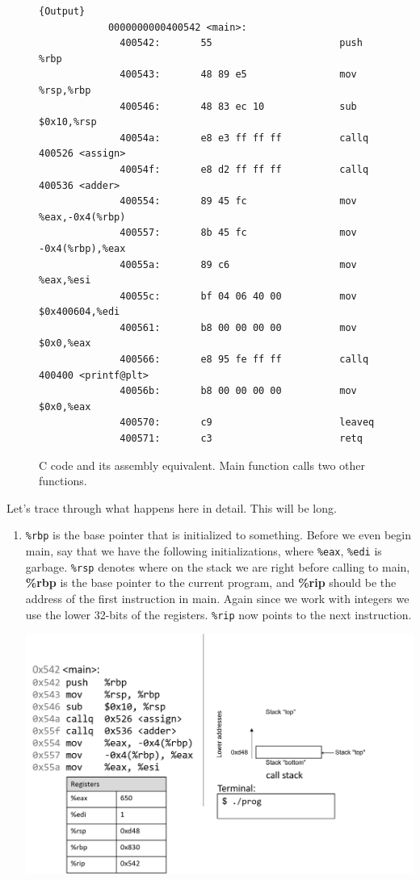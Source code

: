 \documentclass{article}
\begin{document}
\begin{example}
\begin{figure}[H]
\begin{minipage}{.74\textwidth}
\begin{lstlisting}[]{Output}
            0000000000400542 <main>:
              400542:       55                      push   %rbp
              400543:       48 89 e5                mov    %rsp,%rbp
              400546:       48 83 ec 10             sub    $0x10,%rsp
              40054a:       e8 e3 ff ff ff          callq  400526 <assign>
              40054f:       e8 d2 ff ff ff          callq  400536 <adder>
              400554:       89 45 fc                mov    %eax,-0x4(%rbp)
              400557:       8b 45 fc                mov    -0x4(%rbp),%eax
              40055a:       89 c6                   mov    %eax,%esi
              40055c:       bf 04 06 40 00          mov    $0x400604,%edi
              400561:       b8 00 00 00 00          mov    $0x0,%eax
              400566:       e8 95 fe ff ff          callq  400400 <printf@plt>
              40056b:       b8 00 00 00 00          mov    $0x0,%eax
              400570:       c9                      leaveq
              400571:       c3                      retq
          \end{lstlisting}
          \end{minipage}
          \caption{C code and its assembly equivalent. Main function calls two other functions. } 
          \label{fig:calling_functions}
        \end{figure}

        Let's trace through what happens here in detail. This will be long. 

        \begin{enumerate}
          \item \texttt{\%rbp} is the base pointer that is initialized to something. Before we even begin main, say that we have the following initializations, where \texttt{\%eax}, \texttt{\%edi} is garbage. \texttt{\%rsp} denotes where on the stack we are right before calling to main, \textbf{\%rbp} is the base pointer to the current program, and \textbf{\%rip} should be the address of the first instruction in main. Again since we work with integers we use the lower 32-bits of the registers. \texttt{\%rip} now points to the next instruction. 
            \begin{center}
              \includegraphics[scale=0.5]{img/Slide1.png}
            \end{center}  


\end{enumerate}
\end{example}
\end{document}
